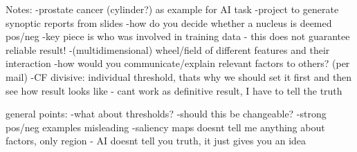  
 Notes:
 -prostate cancer (cylinder?) as example for AI task
 -project to generate synoptic reports from slides
 -how do you decide whether a nucleus is deemed pos/neg
 -key piece is who was involved in training data - this does not guarantee reliable result!
 -(multidimensional) wheel/field of different features and their interaction
 -how would you communicate/explain relevant factors to others? (per mail)
 -CF divisive: individual threshold, thats why we should set it first and then see how result looks like - cant work as definitive result, I have to tell the truth 
 
 general points:
 -what about thresholds?
 -should this be changeable?
 -strong pos/neg examples misleading
 -saliency maps doesnt tell me anything about factors, only region
 - AI doesnt tell you truth, it just gives you an idea